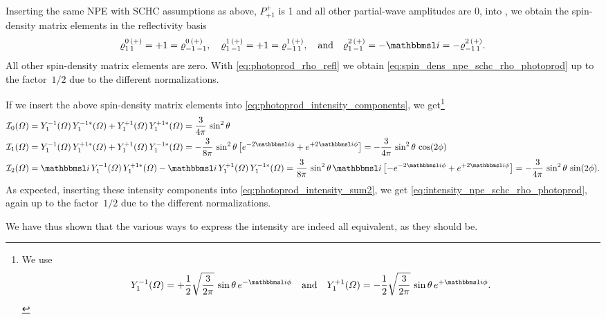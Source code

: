 Inserting the same NPE with SCHC assumptions as above, \ie $P^+_{+1}$
is 1 and all other partial-wave amplitudes are 0, into
, we obtain
the spin-density matrix elements in the reflectivity basis
\begin{equation}
  \varrho^{0\, (+)}_{1\, 1}
  = +1
  = \varrho^{0\, (+)}_{{-1}\, {-1}},
  \quad
  \varrho^{1\, (+)}_{1\, {-1}}
  = +1
  = \varrho^{1\, (+)}_{{-1}\, 1},
  \quad\text{and}\quad
  \varrho^{2\, (+)}_{1\, {-1}}
  = -\imag
  = -\varrho^{2\, (+)}_{{-1}\, 1}.
\end{equation}
All other spin-density matrix elements are zero.  With
\cref{eq:photoprod_rho_refl} we obtain
\cref{eq:spin_dens_npe_schc_rho_photoprod} up to the factor~$1 / 2$
due to the different normalizations.

If we insert the above spin-density matrix elements into
\cref{eq:photoprod_intensity_components}, we get\footnote{%
  We use
  \begin{equation}
    Y_1^{-1}(\Omega)
    = +\frac{1}{2} \sqrt{\frac{3}{2 \pi}}\, \sin \theta\, e^{-\imag \phi}
    \quad\text{and}\quad
    Y_1^{+1}(\Omega)
    = -\frac{1}{2} \sqrt{\frac{3}{2 \pi}}\, \sin \theta\, e^{+\imag \phi}.
  \end{equation}
}
\begin{align*}
  \intensity_0(\Omega)
  ={}& Y_1^{-1}(\Omega)\, Y_1^{-1 *}(\Omega) + Y_1^{+1}(\Omega)\, Y_1^{+1 *}(\Omega)
  = \frac{3}{4 \pi}\, \sin^2 \theta
  \\
  \intensity_1(\Omega)
  ={}& Y_1^{-1}(\Omega)\, Y_1^{+1 *}(\Omega) + Y_1^{+1}(\Omega)\, Y_1^{-1 *}(\Omega)
  = -\frac{3}{8 \pi}\, \sin^2 \theta \sBrk[1]{e^{-2 \imag \phi} + e^{+2 \imag \phi}}
  = -\frac{3}{4 \pi}\, \sin^2 \theta\, \cos(2 \phi)
  \\
  \intensity_2(\Omega)
  ={}& \imag\, Y_1^{-1}(\Omega)\, Y_1^{+1 *}(\Omega) - \imag\, Y_1^{+1}(\Omega)\, Y_1^{-1 *}(\Omega)
  = \frac{3}{8 \pi}\, \sin^2 \theta\, \imag \sBrk[1]{-e^{-2 \imag \phi} + e^{+2 \imag \phi}}
  = -\frac{3}{4 \pi}\, \sin^2 \theta\, \sin(2 \phi).
\end{align*}
As expected, inserting these intensity components into
\cref{eq:photoprod_intensity_sum2}, we get
\cref{eq:intensity_npe_schc_rho_photoprod}, again up to the factor~$1
/ 2$ due to the different normalizations.

We have thus shown that the various ways to express the intensity are
indeed all equivalent, as they should be.
